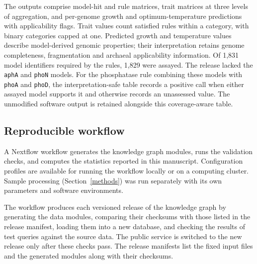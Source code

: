\begin{revision}
The outputs comprise model-hit and rule matrices, trait matrices at three levels of aggregation, and per-genome growth and optimum-temperature predictions with applicability flags. Trait values count satisfied rules within a category, with binary categories capped at one. Predicted growth and temperature values describe model-derived genomic properties; their interpretation retains genome completeness, fragmentation and archaeal applicability information. Of 1,831 model identifiers required by the rules, 1,829 were assayed. The release lacked the \texttt{aphA} and \texttt{phoN} models. For the phosphatase rule combining these models with \texttt{phoA} and \texttt{phoD}, the interpretation-safe table records a positive call when either assayed model supports it and otherwise records an unassessed value. The unmodified software output is retained alongside this coverage-aware table.

\subsection{Reproducible workflow}
A Nextflow \cite{di2017nextflow} workflow generates the knowledge graph modules, runs the validation checks, and computes the statistics reported in this manuscript. Configuration profiles are available for running the workflow locally or on a computing cluster. Sample processing (Section~\ref{methods}) was run separately with its own parameters and software environments.

The workflow produces each versioned release of the knowledge graph by generating the data modules, comparing their checksums with those listed in the release manifest, loading them into a new database, and checking the results of test queries against the source data. The public service is switched to the new release only after these checks pass. The release manifests list the fixed input files and the generated modules along with their checksums.

\end{revision}
